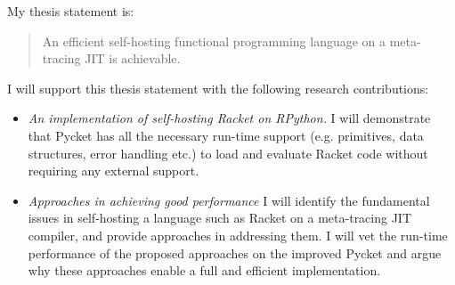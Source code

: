 My thesis statement is:

\begin{quote}
  An efficient self-hosting functional programming language on a
  meta-tracing JIT is achievable.
\end{quote}

I will support this thesis statement with the following research
contributions:

\begin{itemize}
  \item \textit{An implementation of self-hosting Racket on RPython.}
    I will demonstrate that Pycket has all the necessary run-time
    support (e.g. primitives, data structures, error handling etc.)
    to load and evaluate Racket code without requiring any external
    support.
  \item \textit{Approaches in achieving good performance} I will
    identify the fundamental issues in self-hosting a language such as
    Racket on a meta-tracing JIT compiler, and provide approaches in
    addressing them. I will vet the run-time performance of the
    proposed approaches on the improved Pycket and argue why these
    approaches enable a full and efficient implementation.






\end{itemize}


